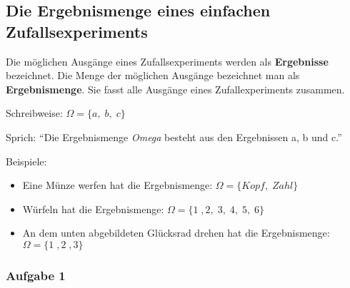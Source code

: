 \documentclass[
  ngerman,
]{book}
\begin{document}
\hypertarget{section-41}{%
\subsubsection*{}\label{section-41}}

\hypertarget{section-42}{%
\subsubsection*{}\label{section-42}}

\hypertarget{die-ergebnismenge-eines-einfachen-zufallsexperiments}{%
\subsection*{Die Ergebnismenge eines einfachen Zufallsexperiments}\label{die-ergebnismenge-eines-einfachen-zufallsexperiments}}

Die möglichen Ausgänge eines Zufallsexperiments werden als \textbf{Ergebnisse} bezeichnet. Die Menge der möglichen Ausgänge bezeichnet man als \textbf{Ergebnismenge}. Sie fasst alle Ausgänge eines Zufallexperiments zusammen.

Schreibweise: \(\Omega = \{a,\;b,\;c\}\)

Sprich: ``Die Ergebnismenge \emph{Omega} besteht aus den Ergebnissen a, b und c.''

Beispiele:

\begin{itemize}
\item
  Eine Münze werfen hat die Ergebnismenge: \(\Omega=\{Kopf,\; Zahl\}\)
\item
  Würfeln hat die Ergebnismenge: \(\Omega=\{1\;, 2,\; 3,\;4,\;5,\;6\}\)
\item
  An dem unten abgebildeten Glücksrad drehen hat die Ergebnismenge: \(\Omega=\{1\;, 2\;, 3\}\)
\end{itemize}

\hypertarget{section-43}{%
\subsubsection*{}\label{section-43}}

\hypertarget{aufgabe-1-6}{%
\subsubsection*{Aufgabe 1}\label{aufgabe-1-6}}
\end{document}
